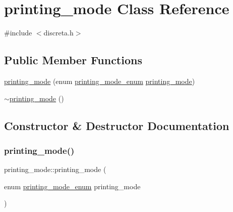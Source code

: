 \hypertarget{classprinting__mode}{}\section{printing\+\_\+mode Class Reference}
\label{classprinting__mode}


{\ttfamily \#include $<$discreta.\+h$>$}

\subsection*{Public Member Functions}
\begin{DoxyCompactItemize}
\item 
\mbox{\hyperlink{classprinting__mode_ac0fa2e92e83b0546c2c8b2be9d66227d}{printing\+\_\+mode}} (enum \mbox{\hyperlink{discreta_8h_abd5a972aa69cb9eb5e94093a5ab1bf86}{printing\+\_\+mode\+\_\+enum}} \mbox{\hyperlink{classprinting__mode}{printing\+\_\+mode}})
\item 
\mbox{\hyperlink{classprinting__mode_a25479afef234155b2279526cf35b804b}{$\sim$printing\+\_\+mode}} ()
\end{DoxyCompactItemize}


\subsection{Constructor \& Destructor Documentation}
\mbox{\label{classprinting__mode_ac0fa2e92e83b0546c2c8b2be9d66227d}} 
\subsubsection{\texorpdfstring{printing\+\_\+mode()}{printing\_mode()}}
{\footnotesize\ttfamily printing\+\_\+mode\+::printing\+\_\+mode (\begin{DoxyParamCaption}\item[{enum \mbox{\hyperlink{discreta_8h_abd5a972aa69cb9eb5e94093a5ab1bf86}{printing\+\_\+mode\+\_\+enum}}}]{printing\+\_\+mode }\end{DoxyParamCaption})}

\mbox{\label{classprinting__mode_a25479afef234155b2279526cf35b804b}} 
